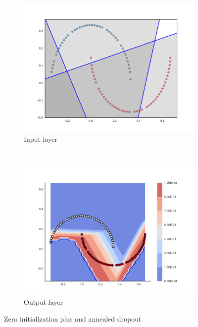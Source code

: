 \begin{figure}
  \centering
    \begin{subfigure}[b]{0.5\textwidth}
        \includegraphics[width=\textwidth]{img/zero/3000/09-conv2d_1-0.pdf}
        \caption{Input layer}
        \label{fig:zerosInput3000}
    \end{subfigure}
    ~ %
    \begin{subfigure}[b]{0.5\textwidth}
        \includegraphics[width=\textwidth]{img/zero/3000/57-09-output.pdf}
        \caption{Output layer}
        \label{fig:zerosOutput3000}
    \end{subfigure}
    
      
  \caption{Zero initialization plus \SepUnitPoint and annealed dropout} 
  \label{fig:zeros} 
\end{figure}


